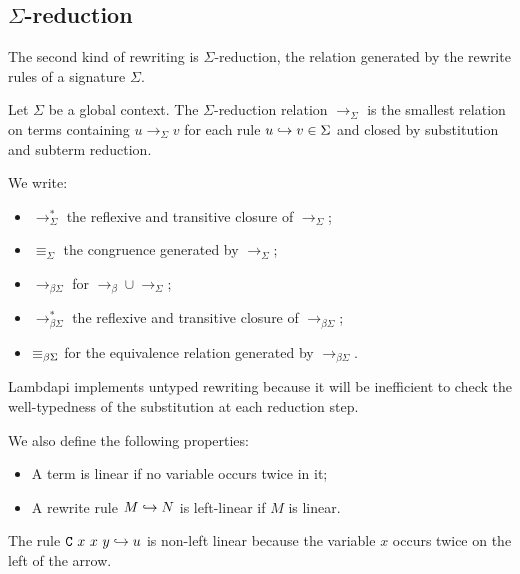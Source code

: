 \subsection{\texorpdfstring{$\Sigma$}{}-reduction}

The second kind of rewriting is $\Sigma$-reduction, the relation generated by the rewrite rules of a signature $\Sigma$.

\begin{definition}
Let $\Sigma$ be a global context. The  $\Sigma$-reduction relation $\longrightarrow_\Sigma$ is the smallest relation on terms containing $u \longrightarrow_\Sigma v$
for each rule $u \hookrightarrow v \in \Sigma$ and closed by substitution and subterm reduction.
\end{definition}

\begin{notation}
We write:

\begin{itemize}
\item $\longrightarrow^*_{\Sigma}$ the reflexive and transitive closure of $\longrightarrow_\Sigma$;
\item $\equiv_\Sigma$ the congruence generated by $\longrightarrow_{\Sigma}$;
\item $\longrightarrow_{\beta\Sigma}$ for $\longrightarrow_{\beta} \cup \longrightarrow_{\Sigma}$;
\item $\longrightarrow^*_{\beta\Sigma}$ the reflexive and transitive closure of $\longrightarrow_{\beta\Sigma}$;
\item $\equiv_{\beta\Sigma}$ for the equivalence relation generated by $\longrightarrow_{\beta\Sigma}$.
\end{itemize}
\end{notation}

Lambdapi implements untyped rewriting because it will be inefficient to check the well-typedness of the substitution at each reduction step.

\begin{definition}[Linearity]
We also define the following properties:
\begin{itemize}
\item A term is linear if no variable occurs twice in it;
\item A rewrite rule $M \hookrightarrow N$ is left-linear if $M$ is linear.
\end{itemize}
\end{definition}

\begin{example}
The rule $\texttt{\upshape{C}}~x~x~y\hookrightarrow u$ is non-left linear because the variable $x$ occurs twice on the left of the arrow.
\end{example}

